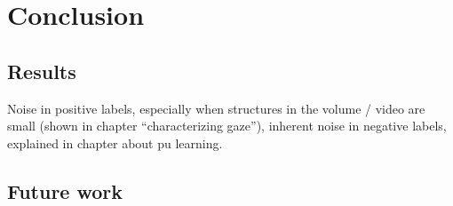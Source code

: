 \chapter{Conclusion}
\label{chap:conclusion}
\section{Results}
Noise in positive labels, especially when structures in the volume / video are small (shown in chapter ``characterizing gaze''), inherent noise in negative labels, explained in chapter about pu learning.
\section{Future work}